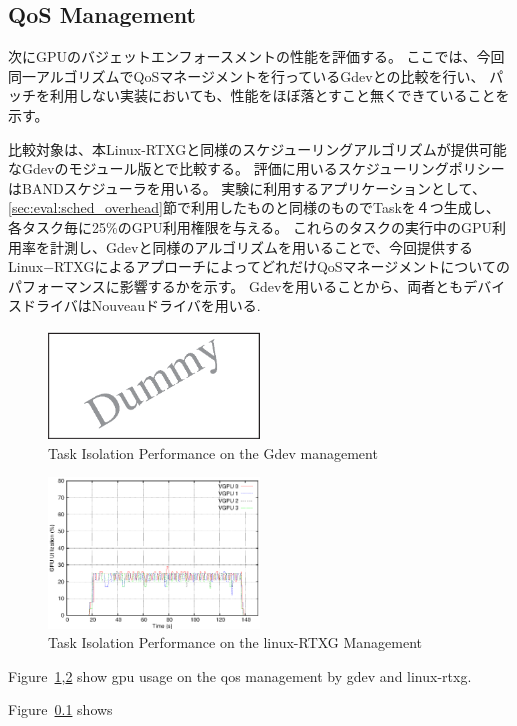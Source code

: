 \subsection{QoS Management}

次にGPUのバジェットエンフォースメントの性能を評価する。
ここでは、今回同一アルゴリズムでQoSマネージメントを行っているGdevとの比較を行い、
パッチを利用しない実装においても、性能をほぼ落とすこと無くできていることを示す。

比較対象は、本Linux-RTXGと同様のスケジューリングアルゴリズムが提供可能なGdevのモジュール版とで比較する。
評価に用いるスケジューリングポリシーはBANDスケジューラを用いる。
実験に利用するアプリケーションとして、\ref{sec:eval:sched_overhead}節で利用したものと同様のものでTaskを４つ生成し、各タスク毎に25\%のGPU利用権限を与える。
これらのタスクの実行中のGPU利用率を計測し、Gdevと同様のアルゴリズムを用いることで、今回提供するLinux−RTXGによるアプローチによってどれだけQoSマネージメントについてのパフォーマンスに影響するかを示す。
Gdevを用いることから、両者ともデバイスドライバはNouveauドライバを用いる.

\begin{figure}[t]
\begin{center}
\includegraphics[width=0.5\textwidth]{img/dummy}
\caption{Task Isolation Performance on the Gdev management}
\end{center}
\label{fig:qos_gdev}
\end{figure}
\begin{figure}[t]
\begin{center}
\includegraphics[width=0.5\textwidth]{img/rtx_qos.eps}
\caption{Task Isolation Performance on the linux-RTXG Management}
\end{center}
\label{fig:qos_rtx}
\end{figure}

Figure~\ref{fig:qos_gdev},\ref{fig:qos_rtx} show gpu usage on the qos management by gdev and linux-rtxg.



Figure~\ref{} shows 
